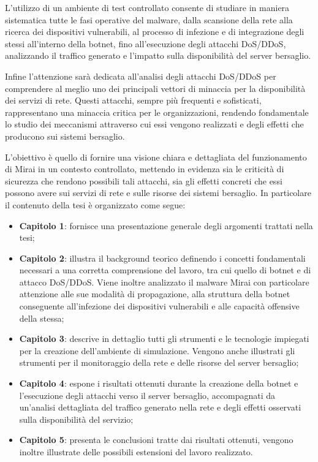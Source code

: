 L'utilizzo di un ambiente di test controllato consente di studiare in maniera sistematica tutte le fasi operative del malware, dalla scansione della rete alla ricerca dei dispositivi vulnerabili, al processo di infezione e di integrazione degli stessi all'interno della botnet, fino all'esecuzione degli attacchi DoS/DDoS, analizzando il traffico generato e l'impatto sulla disponibilità del server bersaglio.

Infine l'attenzione sarà dedicata all'analisi degli attacchi DoS/DDoS per comprendere al meglio uno dei principali vettori di minaccia per la disponibilità dei servizi di rete. Questi attacchi, sempre più frequenti e sofisticati, rappresentano una minaccia critica per le organizzazioni, rendendo fondamentale lo studio dei meccanismi attraverso cui essi vengono realizzati e degli effetti che producono sui sistemi bersaglio. 

L'obiettivo è quello di fornire una visione chiara e dettagliata del funzionamento di Mirai in un contesto controllato, mettendo in evidenza sia le criticità di sicurezza che rendono possibili tali attacchi, sia gli effetti concreti che essi possono avere sui servizi di rete e sulle risorse dei sistemi bersaglio. In particolare il contenuto della tesi è organizzato come segue:
\begin{itemize}
    \item \textbf{Capitolo 1}: fornisce una presentazione generale degli argomenti trattati nella tesi;
    \item \textbf{Capitolo 2}: illustra il background teorico definendo i concetti fondamentali necessari a una corretta comprensione del lavoro, tra cui quello di botnet e di attacco DoS/DDoS. Viene inoltre analizzato il malware Mirai con particolare attenzione alle sue modalità di propagazione, alla struttura della botnet conseguente all'infezione dei dispositivi vulnerabili e alle capacità offensive della stessa;
    \item \textbf{Capitolo 3}: descrive in dettaglio tutti gli strumenti e le tecnologie impiegati per la creazione dell'ambiente di simulazione. Vengono anche illustrati gli strumenti per il monitoraggio della rete e delle risorse del server bersaglio;
    \item \textbf{Capitolo 4}: espone i risultati ottenuti durante la creazione della botnet e l’esecuzione degli attacchi verso il server bersaglio, accompagnati da un’analisi dettagliata del traffico generato nella rete e degli effetti osservati sulla disponibilità del servizio;
    \item \textbf{Capitolo 5}: presenta le conclusioni tratte dai risultati ottenuti, vengono inoltre illustrate delle possibili estensioni del lavoro realizzato.
\end{itemize}



